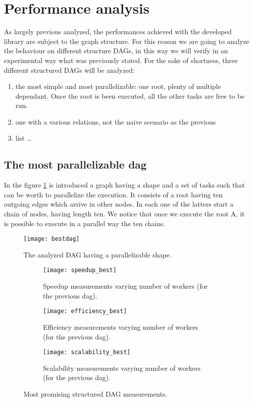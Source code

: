 \documentclass[a4paper,11pt]{article}
\begin{document}
\section{Performance analysis}
As largely previous analyzed, the performances achieved with the developed library are subject to the graph structure. For this reason we are going to analyze the behaviour on different structure DAGs, in this way we will verify in an experimental way what was previously stated.
For the sake of shortness, three different structured DAGs will be analyzed:
\begin{enumerate}
   \item the most simple and most parallelizable: one root, plenty of multiple dependant. Once the root is been executed, all the other tasks are free to be run.
   \item one with a various relations, not the naive scenario as the previous
   \item list \ldots 
 \end{enumerate} 

 \subsection{The most parallelizable dag}
 In the figure \ref{fig:best_dag} is introduced a graph having a shape and a set of tasks such that can be worth to parallelize the execution.
 It consists of a root having ten outgoing edges which arrive in other nodes. In each one of the latters start a chain of nodes, having length ten.
 We notice that once we execute the root A, it is possible to execute in a parallel way the ten chains. 
\begin{figure}[h]
	\centering
	\texttt{[image: bestdag]}
	\caption{The analyzed DAG having a parallelizable shape.}
	\label{fig:best_dag}
\end{figure}

  \begin{figure}
  \begin{subfigure}{0.6\textwidth}
      \texttt{[image: speedup\_best]}
      \caption{Speedup measurements varying number of workers (for the previous dag).}
      \label{fig:speedup_best}
  \end{subfigure}
  \hfill
  \begin{subfigure}{0.6\textwidth}
      \texttt{[image: efficiency\_best]}
      \caption{Efficiency measurements varying number of workers (for the previous dag).}
      \label{fig:third}
  \end{subfigure}
  \hfill
  \begin{subfigure}{0.6\textwidth}
      \texttt{[image: scalability\_best]}
      \caption{Scalability measurements varying number of workers (for the previous dag).}
      \label{fig:third}
  \end{subfigure}          
  \caption{Most promising structured DAG measurements.}
  \label{fig:figures}
  \end{figure}
\end{document}
